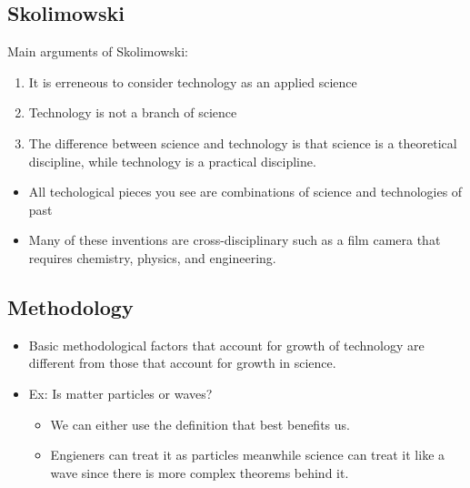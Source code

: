 \documentclass{article}
\begin{document}
\subsection{Skolimowski}
Main arguments of Skolimowski:
\begin{enumerate}
  \item It is erreneous to consider technology as an applied science
  \item Technology is not a branch of science
  \item The difference between science and technology is
    that science is a theoretical discipline, while technology is a practical
    discipline.
\end{enumerate}


\begin{itemize}
  \item All techological pieces you see are combinations of
    science and technologies of past
  \item Many of these inventions are cross-disciplinary
    such as a film camera that requires
    chemistry, physics, and engineering.
\end{itemize}

\subsection{Methodology}
\begin{itemize}
  \item Basic methodological factors that account for
    growth of technology are different from those
    that account for growth in science.
  \item Ex: Is matter particles or waves?
    \begin{itemize}
      \item We can either use the definition that
        best benefits us.
      \item Engieners can treat it as particles
        meanwhile science can treat it like a wave
        since there is more complex theorems behind it.
    \end{itemize}
\end{itemize}
\end{document}
